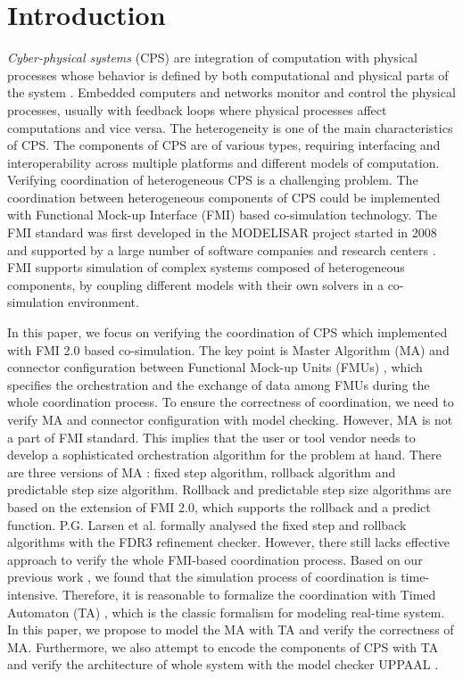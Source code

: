 \section{Introduction}

\textit{Cyber-physical systems} (CPS) are integration of computation with physical processes whose behavior is defined by both computational and physical parts of the system \cite{Zanero17}. Embedded computers and networks monitor and control the physical processes, usually with feedback loops where physical processes affect computations and vice versa. The heterogeneity is one of the main characteristics of CPS. The components of CPS are of various types, requiring interfacing and interoperability across multiple platforms and different models of computation. Verifying coordination of heterogeneous CPS is a challenging problem. The coordination between heterogeneous components of CPS could be implemented with Functional Mock-up Interface (FMI) based co-simulation technology. The FMI standard was first developed in the MODELISAR project started in 2008 and supported by a large number of software companies and research centers \cite{ClauMODELISAR}. FMI supports simulation of complex systems composed of heterogeneous components, by coupling different models with their own solvers in a co-simulation environment.

In this paper, we focus on verifying the coordination of CPS which implemented with FMI 2.0 \cite{Cremona2006Automatic} based co-simulation. The key point is Master Algorithm (MA) \cite{AckerDVM15} and connector configuration between Functional Mock-up Units (FMUs) \cite{Tripakis15}, which specifies the orchestration and the exchange of data among FMUs during the whole coordination process. To ensure the correctness of coordination, we need to verify MA and connector configuration with model checking. However, MA is not a part of FMI standard. This implies that the user or tool vendor needs to develop a sophisticated orchestration algorithm for the problem at hand. 
There are three versions of MA \cite{BromanBGLMTW13}: fixed step algorithm, rollback algorithm and predictable step size algorithm. Rollback and predictable step size algorithms are based on the extension of FMI 2.0, which supports the rollback and a predict function. P.G. Larsen et al. \cite{Larsen2016Integrated} formally analysed the fixed step and rollback algorithms with the FDR3 refinement checker. However, there still lacks effective approach to verify the whole FMI-based coordination process. Based on our previous work \cite{LiuJWCD16}, we found that the simulation process of coordination is time-intensive. Therefore, it is reasonable to formalize the coordination with Timed Automaton (TA) \cite{BehrmannDLHPYH06}, which is the classic formalism for modeling real-time system. 
In this paper, we propose to model the MA with TA and verify the correctness of MA. Furthermore, we also attempt to encode the components of CPS with TA and verify the architecture of whole system with the model checker UPPAAL \cite{BehrmannDLHPYH06}. 

